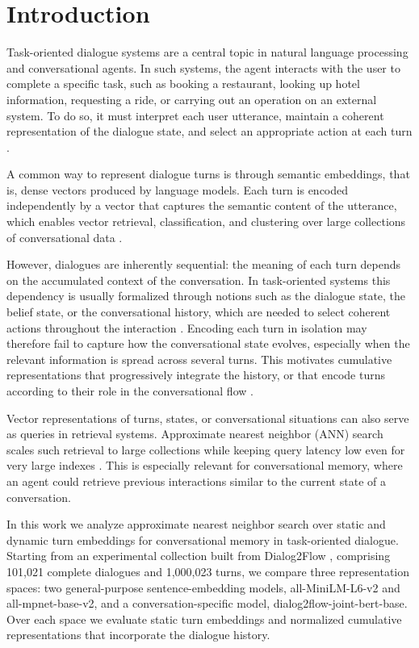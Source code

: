 \documentclass[runningheads]{llncs}
\begin{document}
\section{Introduction}

Task-oriented dialogue systems are a central topic in natural language processing and conversational agents. In such systems, the agent interacts with the user to complete a specific task, such as booking a restaurant, looking up hotel information, requesting a ride, or carrying out an operation on an external system. To do so, it must interpret each user utterance, maintain a coherent representation of the dialogue state, and select an appropriate action at each turn \cite{young2013pomdp,chen2017survey}.

A common way to represent dialogue turns is through semantic embeddings, that is, dense vectors produced by language models. Each turn is encoded independently by a vector that captures the semantic content of the utterance, which enables vector retrieval, classification, and clustering over large collections of conversational data \cite{devlin2019bert,reimers2019sentencebert}.

However, dialogues are inherently sequential: the meaning of each turn depends on the accumulated context of the conversation. In task-oriented systems this dependency is usually formalized through notions such as the dialogue state, the belief state, or the conversational history, which are needed to select coherent actions throughout the interaction \cite{young2013pomdp,williams2013pomdp,chen2017survey}. Encoding each turn in isolation may therefore fail to capture how the conversational state evolves, especially when the relevant information is spread across several turns. This motivates cumulative representations that progressively integrate the history, or that encode turns according to their role in the conversational flow \cite{wen2018sequence,min2020dialogue,hudecek2022latent,liu2023vls}.

Vector representations of turns, states, or conversational situations can also serve as queries in retrieval systems. Approximate nearest neighbor (ANN) search scales such retrieval to large collections while keeping query latency low even for very large indexes \cite{johnson2021billion,malkov2020hnsw}. This is especially relevant for conversational memory, where an agent could retrieve previous interactions similar to the current state of a conversation.

In this work we analyze approximate nearest neighbor search over static and dynamic turn embeddings for conversational memory in task-oriented dialogue. Starting from an experimental collection built from Dialog2Flow \cite{burdisso2024dialog2flow}, comprising 101{,}021 complete dialogues and 1{,}000{,}023 turns, we compare three representation spaces: two general-purpose sentence-embedding models, all-MiniLM-L6-v2 and all-mpnet-base-v2, and a conversation-specific model, dialog2flow-joint-bert-base. Over each space we evaluate static turn embeddings and normalized cumulative representations that incorporate the dialogue history.
\end{document}
